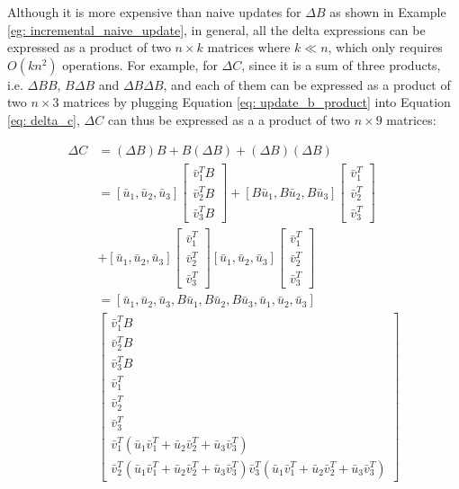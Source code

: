 Although it is more expensive than naive updates for $\Delta B$ as shown in Example \ref{eg: incremental_naive_update}, in general, all the delta expressions can be expressed as a product of two $n \times k$ matrices where $k \ll n$, which only requires $O(kn^2)$ operations. For example, for $\Delta C$, since it is a sum of three products, i.e. $\Delta B B$, $B \Delta B$ and $\Delta B \Delta B$, and each of them can be expressed as a product of two $n \times 3$ matrices by plugging Equation \ref{eq: update_b_product} into Equation \ref{eq: delta_c}, $\Delta C$ can thus be expressed as a a product of two $n \times 9$ matrices:


\begin{equation}
\begin{split}
    \Delta C &= (\Delta B) B + B (\Delta B) + (\Delta B) (\Delta B) \\&=[\bar{u}_1, \bar{u}_2, \bar{u}_3]
\begin{bmatrix}
    \bar{v}^T_1B \\
    \bar{v}^T_2B \\
    \bar{v}^T_3B 
\end{bmatrix}+[B\bar{u}_1, B\bar{u}_2, B\bar{u}_3]
\begin{bmatrix}
    \bar{v}^T_1 \\
    \bar{v}^T_2 \\
    \bar{v}^T_3 
\end{bmatrix}\\
&+[\bar{u}_1, \bar{u}_2, \bar{u}_3]
\begin{bmatrix}
    \bar{v}^T_1  \\
    \bar{v}^T_2  \\
    \bar{v}^T_3  
\end{bmatrix}
[\bar{u}_1, \bar{u}_2, \bar{u}_3]
\begin{bmatrix}
    \bar{v}^T_1  \\
    \bar{v}^T_2  \\
    \bar{v}^T_3  
\end{bmatrix}\\
&=[\bar{u}_1, \bar{u}_2, \bar{u}_3, B\bar{u}_1, B\bar{u}_2, B\bar{u}_3, \bar{u}_1, \bar{u}_2, \bar{u}_3]\\
&\begin{bmatrix}
    \bar{v}^T_1B \\
    \bar{v}^T_2B \\
    \bar{v}^T_3B \\
    \bar{v}^T_1  \\
    \bar{v}^T_2  \\
    \bar{v}^T_3  \\
    \bar{v}^T_1(\bar{u}_1\bar{v}^T_1 + \bar{u}_2\bar{v}^T_2 + \bar{u}_3\bar{v}^T_3)\\
    \bar{v}^T_2(\bar{u}_1\bar{v}^T_1 + \bar{u}_2\bar{v}^T_2 + \bar{u}_3\bar{v}^T_3)
    \bar{v}^T_3(\bar{u}_1\bar{v}^T_1 + \bar{u}_2\bar{v}^T_2 + \bar{u}_3\bar{v}^T_3)
\end{bmatrix}
\end{split}
\end{equation}

